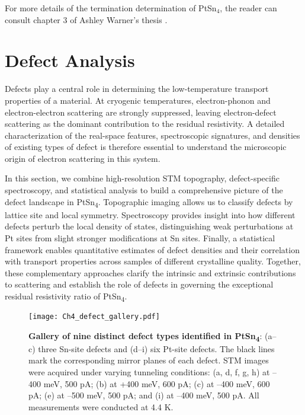 \par For more details of the termination determination of PtSn$_4$, the reader can consult chapter 3 of Ashley Warner's thesis \cite{warnerDefectTerraceCharacterization2022}.



\section{Defect Analysis}
Defects play a central role in determining the low-temperature transport properties of a material. At cryogenic temperatures, electron-phonon and electron-electron scattering are strongly suppressed, leaving electron-defect scattering as the dominant contribution to the residual resistivity. A detailed characterization of the real-space features, spectroscopic signatures, and densities of existing types of defect is therefore essential to understand the microscopic origin of electron scattering in this system.

In this section, we combine high-resolution STM topography, defect-specific spectroscopy, and statistical analysis to build a comprehensive picture of the defect landscape in PtSn\textsubscript{4}. Topographic imaging allows us to classify defects by lattice site and local symmetry. Spectroscopy provides insight into how different defects perturb the local density of states, distinguishing weak perturbations at Pt sites from slight stronger modifications at Sn sites. Finally, a statistical framework enables quantitative estimates of defect densities and their correlation with transport properties across samples of different crystalline quality. Together, these complementary approaches clarify the intrinsic and extrinsic contributions to scattering and establish the role of defects in governing the exceptional residual resistivity ratio of PtSn\textsubscript{4}.

\begin{figure}
	\centering
	\texttt{[image: Ch4\_defect\_gallery.pdf]}
	\caption[\textbf{Gallery of nine distinct defect types identified in PtSn\textsubscript{4}}]{\textbf{Gallery of nine distinct defect types identified in PtSn\textsubscript{4}}: (a–c) three Sn-site defects and (d–i) six Pt-site defects. The black lines mark the corresponding mirror planes of each defect. STM images were acquired under varying tunneling conditions: (a, d, f, g, h) at –400 meV, 500 pA; (b) at +400 meV, 600 pA; (c) at –400 meV, 600 pA; (e) at –500 meV, 500 pA; and (i) at –400 meV, 500 pA. All measurements were conducted at 4.4 K.}
	\label{fig:ch4_defectgallery}
\end{figure}

